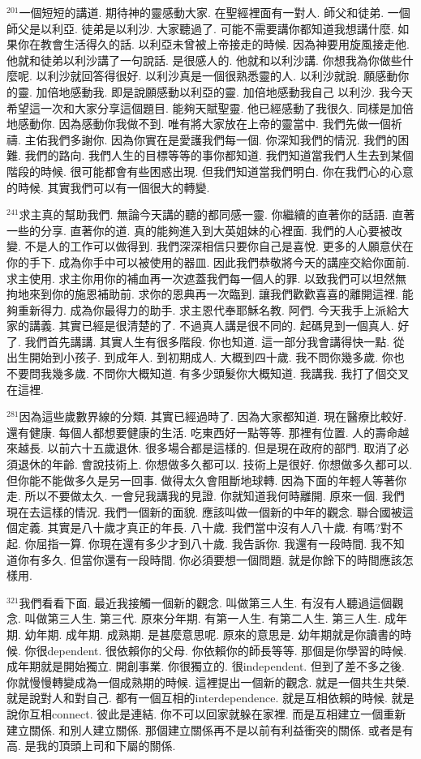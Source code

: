 \documentclass{book}
\begin{document}
$^{201}$一個短短的講道.
期待神的靈感動大家.
在聖經裡面有一對人.
師父和徒弟.
一個師父是以利亞.
徒弟是以利沙.
大家聽過了.
可能不需要講你都知道我想講什麼.
如果你在教會生活得久的話.
以利亞未曾被上帝接走的時候.
因為神要用旋風接走他.
他就和徒弟以利沙講了一句說話.
是很感人的.
他就和以利沙講.
你想我為你做些什麼呢.
以利沙就回答得很好.
以利沙真是一個很熟悉靈的人.
以利沙就說.
願感動你的靈.
加倍地感動我.
即是說願感動以利亞的靈.
加倍地感動我自己 以利沙.
我今天希望這一次和大家分享這個題目.
能夠天賦聖靈.
他已經感動了我很久.
同樣是加倍地感動你.
因為感動你我做不到.
唯有將大家放在上帝的靈當中.
我們先做一個祈禱.
主佑我們多謝你.
因為你實在是愛護我們每一個.
你深知我們的情況.
我們的困難.
我們的路向.
我們人生的目標等等的事你都知道.
我們知道當我們人生去到某個階段的時候.
很可能都會有些困惑出現.
但我們知道當我們明白.
你在我們心的心意的時候.
其實我們可以有一個很大的轉變.

$^{241}$求主真的幫助我們.
無論今天講的聽的都同感一靈.
你繼續的直著你的話語.
直著一些的分享.
直著你的道.
真的能夠進入到大英姐妹的心裡面.
我們的人心要被改變.
不是人的工作可以做得到.
我們深深相信只要你自己是喜悅.
更多的人願意伏在你的手下.
成為你手中可以被使用的器皿.
因此我們恭敬將今天的講座交給你面前.
求主使用.
求主你用你的補血再一次遮蓋我們每一個人的罪.
以致我們可以坦然無拘地來到你的施恩補助前.
求你的恩典再一次臨到.
讓我們歡歡喜喜的離開這裡.
能夠重新得力.
成為你最得力的助手.
求主恩代奉耶穌名教.
阿們.
今天我手上派給大家的講義.
其實已經是很清楚的了.
不過真人講是很不同的.
起碼見到一個真人.
好了.
我們首先講講.
其實人生有很多階段.
你也知道.
這一部分我會講得快一點.
從出生開始到小孩子.
到成年人.
到初期成人.
大概到四十歲.
我不問你幾多歲.
你也不要問我幾多歲.
不問你大概知道.
有多少頭髮你大概知道.
我講我.
我打了個交叉在這裡.

$^{281}$因為這些歲數界線的分類.
其實已經過時了.
因為大家都知道.
現在醫療比較好.
還有健康.
每個人都想要健康的生活.
吃東西好一點等等.
那裡有位置.
人的壽命越來越長.
以前六十五歲退休.
很多場合都是這樣的.
但是現在政府的部門.
取消了必須退休的年齡.
會說技術上.
你想做多久都可以.
技術上是很好.
你想做多久都可以.
但你能不能做多久是另一回事.
做得太久會阻斷地球轉.
因為下面的年輕人等著你走.
所以不要做太久.
一會兒我講我的見證.
你就知道我何時離開.
原來一個.
我們現在去這樣的情況.
我們一個新的面貌.
應該叫做一個新的中年的觀念.
聯合國被這個定義.
其實是八十歲才真正的年長.
八十歲.
我們當中沒有人八十歲.
有嗎?對不起.
你屈指一算.
你現在還有多少才到八十歲.
我告訴你.
我還有一段時間.
我不知道你有多久.
但當你還有一段時間.
你必須要想一個問題.
就是你餘下的時間應該怎樣用.

$^{321}$我們看看下面.
最近我接觸一個新的觀念.
叫做第三人生.
有沒有人聽過這個觀念.
叫做第三人生.
第三代.
原來分年期.
有第一人生.
有第二人生.
第三人生.
成年期.
幼年期.
成年期.
成熟期.
是甚麼意思呢.
原來的意思是.
幼年期就是你讀書的時候.
你很dependent.
很依賴你的父母.
你依賴你的師長等等.
那個是你學習的時候.
成年期就是開始獨立.
開創事業.
你很獨立的.
很independent.
但到了差不多之後.
你就慢慢轉變成為一個成熟期的時候.
這裡提出一個新的觀念.
就是一個共生共榮.
就是說對人和對自己.
都有一個互相的interdependence.
就是互相依賴的時候.
就是說你互相connect.
彼此是連結.
你不可以回家就躲在家裡.
而是互相建立一個重新建立關係.
和別人建立關係.
那個建立關係再不是以前有利益衝突的關係.
或者是有高.
是我的頂頭上司和下屬的關係.
\end{document}
